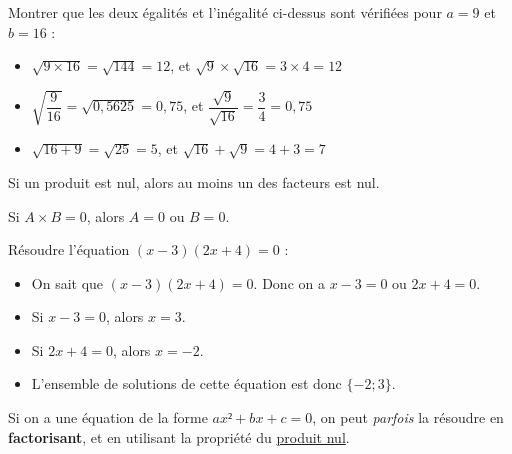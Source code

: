 \documentclass[
	classe=$2^{de}$
]{coursclass}
\begin{document}
\begin{greybox}
	Montrer que les deux égalités et l'inégalité ci-dessus sont vérifiées pour $a = 9$ et $b = 16$ :

	\begin{itemize}
		\item $\sqrt{9×16} = \sqrt{144} = 12$, et $\sqrt{9}×\sqrt{16}=3×4=12$
		\item $\sqrt{\dfrac{9}{16}} = \sqrt{0,5625} = 0,75$, et $\dfrac{\sqrt{9}}{\sqrt{16}} = \dfrac{3}{4} = 0,75$
		\item $\sqrt{16 + 9} = \sqrt{25} = 5$, et $\sqrt{16} + \sqrt{9}=4 + 3=7$
	\end{itemize}
\end{greybox}

\begin{propriete} \label{propriete:Produit nul}
	Si un produit est nul, alors au moins un des facteurs est nul.

	\begin{center}
		Si $A × B = 0$, alors $A = 0$ ou $B = 0$.
	\end{center}
\end{propriete}

\begin{exemple}
	Résoudre l'équation $(x - 3)(2x + 4) = 0$ :

	\begin{itemize}
		\item On sait que $(x - 3)(2x + 4) = 0$. Donc on a $x - 3 = 0$ ou $2x + 4 = 0$.
		\item Si $x - 3 = 0$, alors $x = 3$.
		\item Si $2x + 4 = 0$, alors $x = -2$.
		\item L'ensemble de solutions de cette équation est donc $\{-2 ; 3\}$.
	\end{itemize}
\end{exemple}

\begin{propriete}
	Si on a une équation de la forme $ax² + bx + c = 0$, on peut \textit{parfois} la résoudre en \textbf{factorisant}, et en utilisant la propriété du \hyperref[propriete:Produit nul]{produit nul}.
\end{propriete}
\end{document}
